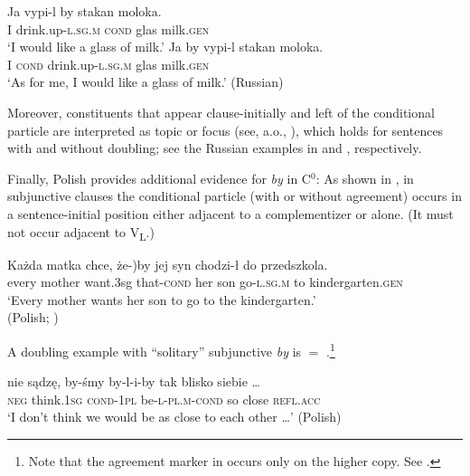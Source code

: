 \documentclass[output=paper]{langscibook}
\begin{document}
\ea
\ea 
\gll Ja vypi-l by stakan moloka.\\
I drink.up-\textsc{l.sg.m} \textsc{cond} glas milk.\textsc{gen}\\ 
\glt `I would like a glass of milk.' \hfill \citep[277]{Xrakovskij2009}
\ex
\gll Ja by vypi-l stakan moloka.\\
I \textsc{cond} drink.up-\textsc{l.sg.m} glas milk.\textsc{gen}\\
\glt `As for me, I would like a glass of milk.' \hfill (Russian)
\label{pitsch:ex:Russian_alternative_b}
\z
\label{pitsch:ex:Russian_alternative}
\z

\noindent Moreover, constituents that appear clause-initially and left of the conditional particle are interpreted as topic or focus (see, a.o., \cites[327]{Willis2000}[230--231]{Migdalski2006}), which holds for sentences with and without doubling; see the Russian examples in  and , respectively.

Finally, Polish provides additional evidence for \textit{by} in C$^0$: As shown in , in subjunctive clauses the conditional particle (with or without agreement) occurs in a sentence-initial position either adjacent to a complementizer or alone. (It must not occur adjacent to V\textsubscript{L}.)

\ea 
\gll Każda matka chce, \minsp{(} że-)by jej syn chodzi-ł do przedszkola. \\
every mother want.3sg {} that-\textsc{cond} her son go-\textsc{l.sg.m} to kindergarten.\textsc{gen}\\
\glt `Every mother wants her son to go to the kindergarten.' \\ \hfill (Polish; \citealt[109]{Jedrzejowski2020})
\label{pitsch:ex:PolJedrz}
\z

\noindent A doubling example with ``solitary'' subjunctive \textit{by} is  $=$ .\footnote{Note that the agreement marker in  occurs only on the higher copy. See .}

\ea
\gll nie sądzę, by-śmy by-l-i-by tak blisko siebie \ldots \\
\textsc{neg} think.\textsc{1sg} \textsc{cond-1pl} be\textsc{-l-pl.m-cond} so close \textsc{refl.acc} {} \\ 
\glt `I don't think we would be as close to each other \ldots' \hfill (Polish) \label{pitsch:ex:doubling_Polish_coll_rep}
\z
\end{document}
